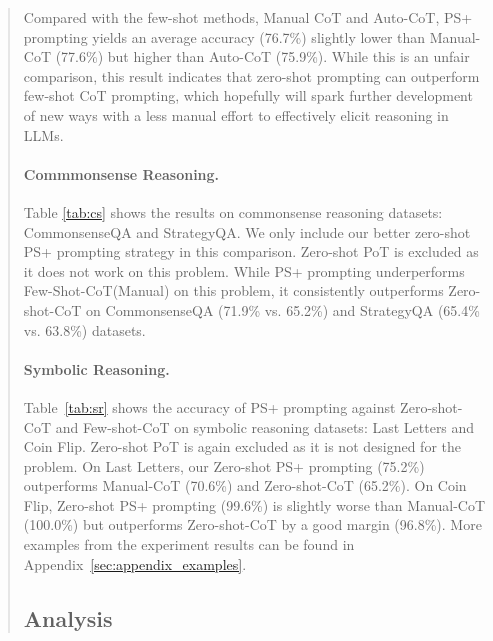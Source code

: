 \documentclass[11pt]{article}
\begin{document}
\begin{abstract}
Compared with the few-shot methods, Manual CoT and Auto-CoT, PS+ prompting yields an average accuracy (76.7\%) slightly lower than Manual-CoT (77.6\%) but higher than Auto-CoT (75.9\%).
While this is an unfair comparison, this result indicates that zero-shot prompting can outperform few-shot CoT prompting, which hopefully will spark further development of new ways with a less manual effort to effectively elicit reasoning in LLMs.

\paragraph{Commmonsense Reasoning.}

Table \ref{tab:cs} shows the results on commonsense reasoning datasets: CommonsenseQA and StrategyQA. We only include our better zero-shot PS+ prompting strategy in this comparison.  Zero-shot PoT is excluded as it does not work on this problem. 
While PS+ prompting underperforms Few-Shot-CoT(Manual) on this problem, it consistently outperforms Zero-shot-CoT on CommonsenseQA (71.9\% vs. 65.2\%) and StrategyQA (65.4\% vs. 63.8\%) datasets.

\paragraph{Symbolic Reasoning.}
Table~\ref{tab:sr} shows the accuracy of PS+ prompting against Zero-shot-CoT and Few-shot-CoT on symbolic reasoning datasets: Last Letters and Coin Flip. Zero-shot PoT is again excluded as it is not designed for the problem.
On Last Letters, our Zero-shot PS+ prompting (75.2\%) outperforms Manual-CoT (70.6\%) and Zero-shot-CoT (65.2\%). On Coin Flip, Zero-shot PS+ prompting (99.6\%) is slightly worse than Manual-CoT (100.0\%) but outperforms Zero-shot-CoT by a good margin (96.8\%).
More examples from the experiment results can be found in Appendix~\ref{sec:appendix_examples}.

\subsection{Analysis}






\end{abstract}
\end{document}
